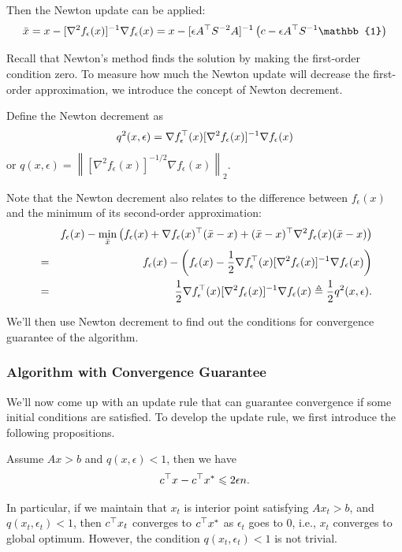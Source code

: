 Then the Newton update can be applied:
\begin{equation}
\bar{x}=x-[\nabla^2f_\epsilon(x)]^{-1}\nabla f_\epsilon(x)=x-[\epsilon A^\trans S^{-2}A]^{-1}\left(c-\epsilon A^\trans S^{-1}\mathbb{1}\right)\label{eq:Newton_update}
\end{equation}

Recall that Newton's method finds the solution by making the first-order condition zero. To measure how much the Newton update will decrease the first-order approximation, we introduce the concept of Newton decrement.

Define the Newton decrement as
\begin{equation}
q^2(x, \epsilon) = \nabla f^\top_\epsilon(x)[\nabla^2f_\epsilon(x)]^{-1}\nabla f_\epsilon(x)\label{eq:newton_decrement}
\end{equation}
or $q(x, \epsilon) = \left\|[\nabla^2f_\epsilon(x)]^{-1/2}\nabla f_\epsilon(x)\right\|_2$. 

Note that the Newton decrement also relates to the difference between $f_\epsilon(x)$ and the minimum of its second-order approximation:
\begin{eqnarray}
&&f_\epsilon(x)-\min_{\bar{x}}\left(f_\epsilon(x)+\nabla f_\epsilon(x)^\top(\bar{x}-x)+(\bar{x}-x)^\top\nabla^2 f_\epsilon(x)(\bar{x}-x)\right)\nonumber\\
&=&f_\epsilon(x)-\left(f_\epsilon(x)-\dfrac{1}{2}\nabla f^\top_\epsilon(x)[\nabla^2f_\epsilon(x)]^{-1}\nabla f_\epsilon(x)\right)\nonumber\\
&=&\dfrac{1}{2}\nabla f^\top_\epsilon(x)[\nabla^2f_\epsilon(x)]^{-1}\nabla f_\epsilon(x)\triangleq \dfrac{1}{2}q^2(x, \epsilon).
\end{eqnarray}

We'll then use Newton decrement to find out the conditions for convergence guarantee of the algorithm. 

\subsubsection{Algorithm with Convergence Guarantee}
We'll now come up with an update rule that can guarantee convergence if some initial conditions are satisfied. To develop the update rule, we first introduce the following propositions. 
\begin{proposition}\label{prop1}
Assume $Ax > b$ and $q(x, \epsilon)<1$, then we have
\begin{align}
c^\top x-c^\top x^{*}\leqslant 2\epsilon n.
\end{align}
\end{proposition}
In particular, if we maintain that $x_t$ is interior point satisfying $Ax_t>b$,
and $q(x_t, \epsilon_t) < 1$, then $c^\top x_t$ converges to $c^\top x^*$ as $\epsilon_t$ goes to $0$, i.e., $x_t$ converges to global optimum. However, the condition $q(x_t,\epsilon_t)<1$ is not trivial.  

